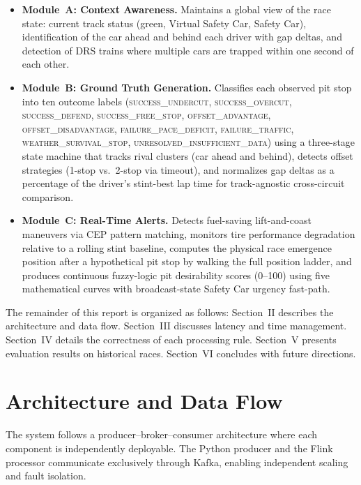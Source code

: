 \documentclass[a4paper,twocolumn]{article}
\begin{document}
\begin{itemize}
  \item \textbf{Module~A: Context Awareness.} Maintains a global view
    of the race state: current track status (green, Virtual Safety Car,
    Safety Car), identification of the car ahead and behind each driver
    with gap deltas, and detection of DRS trains where multiple cars are
    trapped within one second of each other.
  \item \textbf{Module~B: Ground Truth Generation.} Classifies each
    observed pit stop into ten outcome labels
    (\textsc{success\_undercut}, \textsc{success\_overcut},
    \textsc{success\_defend}, \textsc{success\_free\_stop},
    \textsc{offset\_advantage}, \textsc{offset\_disadvantage},
    \textsc{failure\_pace\_deficit}, \textsc{failure\_traffic},
    \textsc{weather\_survival\_stop},
    \textsc{unresolved\_insufficient\_data})
    using a three-stage state machine that tracks rival clusters (car
    ahead and behind), detects offset strategies (1-stop vs.\ 2-stop via
    timeout), and normalizes gap deltas as a percentage of the driver's
    stint-best lap time for track-agnostic cross-circuit comparison.
  \item \textbf{Module~C: Real-Time Alerts.} Detects fuel-saving
    lift-and-coast maneuvers via CEP pattern matching, monitors tire
    performance degradation relative to a rolling stint baseline,
    computes the physical race emergence position after a hypothetical
    pit stop by walking the full position ladder, and produces continuous
    fuzzy-logic pit desirability scores (0--100) using five mathematical
    curves with broadcast-state Safety Car urgency fast-path.
\end{itemize}

The remainder of this report is organized as follows: Section~II
describes the architecture and data flow. Section~III discusses
latency and time management. Section~IV details the correctness of
each processing rule. Section~V presents evaluation results on
historical races. Section~VI concludes with future directions.

\section{Architecture and Data Flow}

The system follows a producer--broker--consumer architecture where each
component is independently deployable. The Python producer and the Flink
processor communicate exclusively through Kafka, enabling independent
scaling and fault isolation.
\end{document}
